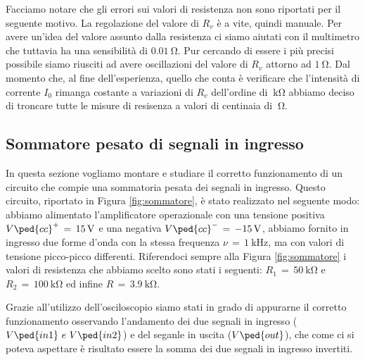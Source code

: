 Facciamo notare che gli errori sui valori di resistenza non sono riportati per il seguente motivo. 
La regolazione del valore di $R_v$ è a vite, quindi manuale.
Per avere un'idea del valore assunto dalla resistenza ci siamo aiutati con il multimetro che tuttavia ha una sensibilità di $\SI{0.01}{\ohm}$. Pur cercando di essere i più precisi possibile siamo riusciti ad avere oscillazioni del valore di $R_v$ attorno ad $\SI{1}{\ohm}$. Dal momento che, al fine dell'esperienza, quello che conta è verificare che l'intensità di corrente $I_0$ rimanga costante a variazioni di $R_v$ dell'ordine di $\SI{}{\kilo\ohm}$ abbiamo deciso di troncare tutte le misure di resisenza a valori di centinaia di $\SI{}{\ohm}$.

\subsection*{Sommatore pesato di segnali in ingresso}

In questa sezione vogliamo montare e studiare il corretto funzionamento di un circuito che compie una sommatoria pesata dei segnali in ingresso. Questo circuito, riportato in Figura \ref{fig:sommatore}, è stato realizzato nel seguente modo: abbiamo alimentato l'amplificatore operazionale con una tensione positiva $V\ped{cc}^+\,=\,\SI{+15}{\volt}$ e una negativa $V\ped{cc}^-\,=\,\SI{-15}{\volt}$, abbiamo fornito in ingresso due forme d'onda con la stessa frequenza $\nu\,=\,\SI{1}{\kilo\hertz}$, ma con valori di tensione picco-picco differenti. Riferendoci sempre alla Figura \ref{fig:sommatore} i valori di resistenza che abbiamo scelto sono stati i seguenti: $R_1\,=\,\SI{50}{\kilo\ohm}$ e $R_2\,=\,\SI{100}{\kilo\ohm}$ ed infine $R\,=\,\SI{3.9}{\kilo\ohm}$.

Grazie all'utilizzo dell'osciloscopio siamo stati in grado di appurarne il corretto funzionamento osservando l'andamento dei due segnali in ingresso ($V\ped{in1}\,\,e\,\,V\ped{in2} $) e del seganle in uscita ($V\ped{out}$), che come ci si poteva aspettare è risultato essere la somma dei due segnali in ingresso invertiti.

